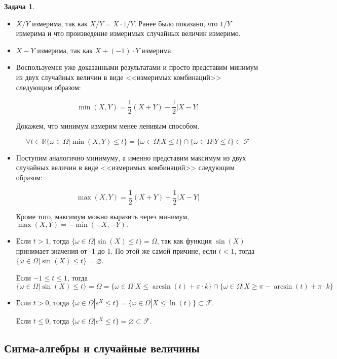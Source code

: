 \documentclass[pdftex, 12pt, a4paper]{article}
\def\R{\ensuremath{\mathbb{R}}} %
\def\F{\ensuremath{\mathcal{F}}} %
\def \Om{\Omega}
\def \om{\omega}
\renewcommand{\le}{\leqslant}
\renewcommand{\ge}{\geqslant}
\theoremstyle{definition} %
\newtheorem{problem}{Задача}
\numberwithin{problem}{section}
\numberwithin{blits}{section}
\begin{document}
\begin{problem}
\begin{sol}
\begin{itemize}
\item $X/Y$ измерима, так как $X/Y = X \cdot 1/Y$. Ранее было показано, что $1/Y$ измерима и что произведение измеримых случайных величин измеримо.

\item $X-Y$ измерима, так как $X+ (-1) \cdot Y$ измерима.

\item Воспользуемся уже доказанными результатами и просто представим минимум из двух случайных величин в виде <<измеримых комбинаций>> следующим образом:

\[\min(X,Y) = \frac{1}{2}(X+Y)-\frac{1}{2}|X-Y| \]

Докажем, что минимум измерим менее ленивым способом. 

\[\forall t \in \R \{\om \in \Om | \min(X,Y) \le t \} = \{ \om \in \Om | X \le t \} \cap \{ \om \in \Om | Y \le t\} \subset \F\]

\item Поступим аналогично минимуму, а именно представим максимум из двух случайных величин в виде <<измеримых комбинаций>> следующим образом:

\[\max(X,Y) = \frac{1}{2}(X+Y)+\frac{1}{2}|X-Y| \]

Кроме того, максимум можно выразить через минимум, $\max(X,Y) = -\min(-X,-Y).$

\item Если $t >1$, тогда $ \{\om \in \Om | \sin(X) \le t \}=\Om$, так как функция $\sin(X)$ принимает значения от -1 до 1. По этой же самой причине, если $t<1$, тогда $ \{\om \in \Om | \sin(X) \le t \}=\varnothing$.


Если $-1 \le t \le 1$, тогда $ \{\om \in \Om | \sin(X) \le t \}=\Om = \{\om \in \Om | X \le \arcsin(t) +\pi\cdot k \}\cap \{\om \in \Om | X \ge \pi -\arcsin(t) + \pi \cdot k \}$

\item Если $t>0$, тогда $\{\om \in \Om|e^{X} \le t\} = \{\om \in \Om | X \le \ln(t) \} \subset \F$.

Если $t \le 0 $, тогда $\{\om \in \Om|e^{X} \le t\} = \varnothing \subset \F$. 

\end{itemize}
\end{sol}
\end{problem}






\subsection{Сигма-алгебры и случайные величины}
\end{document}
